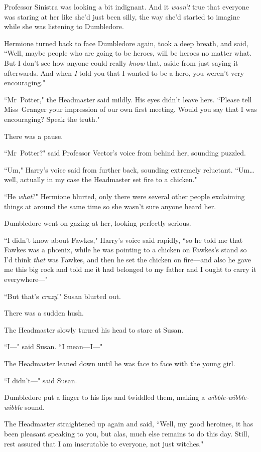 Professor Sinistra was looking a bit indignant. And it \emph{wasn't} true that everyone was staring at her like she'd just been silly, the way she'd started to imagine while she was listening to Dumbledore.

Hermione turned back to face Dumbledore again, took a deep breath, and said, ``Well, maybe people who are going to be heroes, will be heroes no matter what. But I don't see how anyone could really \emph{know} that, aside from just saying it afterwards. And when \emph{I} told you that I wanted to be a hero, you weren't very encouraging."

``Mr~Potter," the Headmaster said mildly. His eyes didn't leave hers. ``Please tell Miss~Granger your impression of our own first meeting. Would you say that I was encouraging? Speak the truth."

There was a pause.

``Mr~Potter?" said Professor Vector's voice from behind her, sounding puzzled.

``Um," Harry's voice said from further back, sounding extremely reluctant. ``Um{\ldots} well, actually in my case the Headmaster set fire to a chicken."

``He \emph{what}?" Hermione blurted, only there were several other people exclaiming things at around the same time so she wasn't sure anyone heard her.

Dumbledore went on gazing at her, looking perfectly serious.

``I didn't know about Fawkes," Harry's voice said rapidly, ``so he told me that Fawkes was a phœnix, while he was pointing to a chicken on Fawkes's stand so I'd think \emph{that} was Fawkes, and then he set the chicken on fire—and also he gave me this big rock and told me it had belonged to my father and I ought to carry it everywhere—"

``But that's \emph{crazy}!" Susan blurted out.

There was a sudden hush.

The Headmaster slowly turned his head to stare at Susan.

``I—" said Susan. ``I mean—I—"

The Headmaster leaned down until he was face to face with the young girl.

``I didn't—" said Susan.

Dumbledore put a finger to his lips and twiddled them, making a \emph{wibble-wibble-wibble} sound.

The Headmaster straightened up again and said, ``Well, my good heroines, it has been pleasant speaking to you, but alas, much else remains to do this day. Still, rest assured that I am inscrutable to everyone, not just witches."

